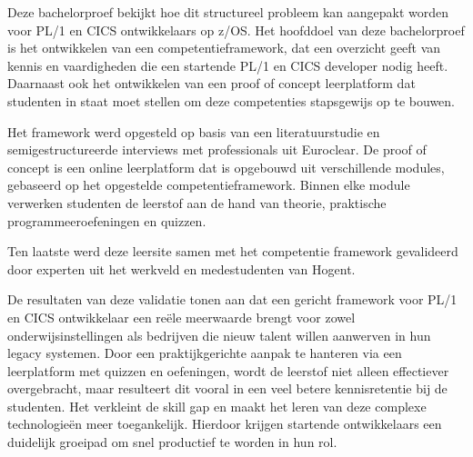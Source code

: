 Deze bachelorproef bekijkt hoe dit structureel probleem kan aangepakt worden voor PL/1 en CICS ontwikkelaars op z/OS.
Het hoofddoel van deze bachelorproef is het ontwikkelen van een competentieframework, dat een overzicht geeft van kennis en vaardigheden die een startende PL/1 en CICS developer nodig heeft.
Daarnaast ook het ontwikkelen van een proof of concept leerplatform dat studenten in staat moet stellen om deze competenties stapsgewijs op te bouwen.

Het framework werd opgesteld op basis van een literatuurstudie en semigestructureerde interviews met professionals uit Euroclear.
De proof of concept is een online leerplatform dat is opgebouwd uit verschillende modules, gebaseerd op het opgestelde competentieframework.
Binnen elke module verwerken studenten de leerstof aan de hand van theorie, praktische programmeeroefeningen en quizzen.


Ten laatste werd deze leersite samen met het competentie framework gevalideerd door experten uit het werkveld en medestudenten van Hogent.

De resultaten van deze validatie tonen aan dat een gericht framework voor PL/1 en CICS ontwikkelaar een reële meerwaarde brengt voor zowel onderwijsinstellingen als bedrijven die nieuw talent willen aanwerven in hun legacy systemen.
Door een praktijkgerichte aanpak te hanteren via een leerplatform met quizzen en oefeningen, wordt de leerstof niet alleen effectiever overgebracht, maar resulteert dit vooral in een veel betere kennisretentie bij de studenten.
Het verkleint de skill gap en maakt het leren van deze complexe technologieën meer toegankelijk.
Hierdoor krijgen startende ontwikkelaars een duidelijk groeipad om snel productief te worden in hun rol.

